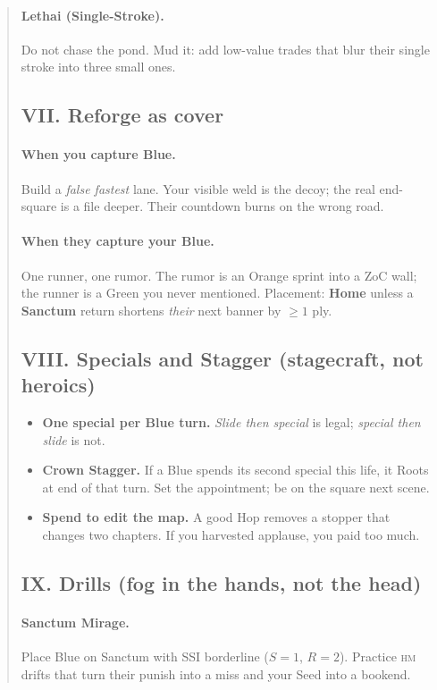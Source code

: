 \documentclass[11pt]{article}
\begin{document}
\begin{quote}
\paragraph{Lethai (Single-Stroke).} Do not chase the pond. Mud it: add low-value trades that blur their single stroke into three small ones.

\subsection{VII. Reforge as cover}
\paragraph{When you capture Blue.} Build a \emph{false fastest} lane. Your visible weld is the decoy; the real end-square is a file deeper. Their countdown burns on the wrong road.
\paragraph{When they capture your Blue.} One runner, one rumor. The rumor is an Orange sprint into a ZoC wall; the runner is a Green you never mentioned. Placement: \textbf{Home} unless a \textbf{Sanctum} return shortens \emph{their} next banner by $\ge 1$ ply.

\subsection{VIII. Specials and Stagger (stagecraft, not heroics)}
\begin{itemize}\itemsep=0.2em
  \item \textbf{One special per Blue turn.} \emph{Slide then special} is legal; \emph{special then slide} is not.
  \item \textbf{Crown Stagger.} If a Blue spends its second special this life, it Roots at end of that turn. Set the appointment; be on the square next scene.
  \item \textbf{Spend to edit the map.} A good Hop removes a stopper that changes two chapters. If you harvested applause, you paid too much.
\end{itemize}

\subsection{IX. Drills (fog in the hands, not the head)}
\paragraph{Sanctum Mirage.} Place Blue on Sanctum with SSI borderline ($S{=}1$, $R{=}2$). Practice \textsc{hm} drifts that turn their punish into a miss and your Seed into a bookend.

\end{quote}
\end{document}
